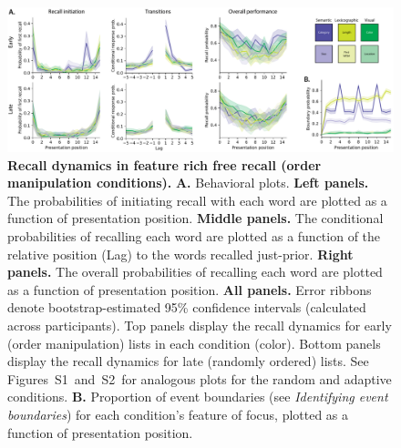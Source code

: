 \documentclass[11pt]{article}
\newcommand{\dynamicsRandom}{S1}
\newcommand{\dynamicsAdaptive}{S2}
\begin{document}
\begin{figure}[tp] \centering
\includegraphics[width=\textwidth]{figures/recall_dynamics}

\caption{\textbf{Recall dynamics in feature rich free recall (order
manipulation conditions).} \textbf{A.} Behavioral plots. \textbf{Left panels.}
The probabilities of initiating recall with each word are plotted as a function
of presentation position. \textbf{Middle panels.} The conditional probabilities
of recalling each word are plotted as a function of the relative position (Lag)
to the words recalled just-prior. \textbf{Right panels.} The overall
probabilities of recalling each word are plotted as a function of presentation
position. \textbf{All panels.} Error ribbons denote bootstrap-estimated 95\%
confidence intervals (calculated across participants). Top panels display the
recall dynamics for early (order manipulation) lists in each condition (color).
Bottom panels display the recall dynamics for late (randomly ordered) lists.
See Figures~\dynamicsRandom~and~\dynamicsAdaptive~for analogous plots for the
random and adaptive conditions. \textbf{B.} Proportion of event boundaries (see
\textit{Identifying event boundaries}) for each condition's feature of focus,
plotted as a function of presentation position.}

    \label{fig:recall-dynamics}
\end{figure}
\end{document}
